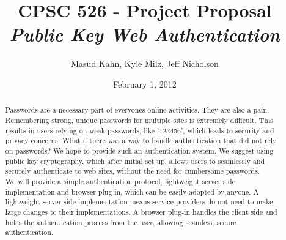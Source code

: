 \documentclass[11pt]{article}
\begin{document}
\title{\bf CPSC 526 - Project Proposal \\ \emph{Public Key Web Authentication}}
\author{Masud Kahn, Kyle Milz, Jeff Nicholson}
\date{February 1, 2012} 
\maketitle

\tableofcontents
\pagebreak
\begin{abstract}
Passwords are a necessary part of everyones online activities. They are also a pain. Remembering strong, unique passwords for multiple sites is extremely difficult. This results in users relying on weak passwords, like '123456', which leads to security and privacy concerns. What if there was a way to handle authentication that did not rely on passwords? We hope to provide such an authentication system. We suggest using public key cryptography, which after initial set up, allows users to seamlessly and securely authenticate to web sites, without the need for cumbersome passwords.\\
We will provide a simple authentication protocol, lightweight server side implementation and browser plug in, which can be easily adopted by anyone. A lightweight server side implementation means service providers do not need to make large changes to their implementations. A browser plug-in handles the client side and hides the authentication process from the user, allowing seamless, secure authentication.
\end{abstract}
\pagebreak
\end{document}
